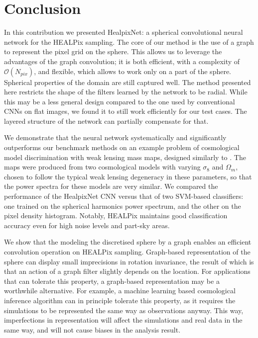 \documentclass[final,twocolumn,3p,times,authoryear]{elsarticle}
\newcommand{\nati}[1]{{\color[rgb]{.1,.6,.1}{#1}}}
\newcommand{\TK}[1]{{\color{red}{TK:#1}}}
\newcommand{\1}{\b{1}}              %
\newcommand{\0}{\b{0}}              %
\begin{document}

\section{Conclusion}
\label{sec:conclusion}

In this contribution we presented HealpixNet: a spherical convolutional neural network for the HEALPix sampling.
The core of our method is the use of a graph to represent the pixel grid on the sphere.
This allows us to leverage the advantages of the graph convolution; it is both efficient, with a complexity of $\mathcal{O}(N_{pix})$, and flexible, which allows to work only on a part of the sphere.
Spherical properties of the domain are still captured well.
The method presented here restricts the shape of the filters learned by the network to be radial.
While this may be a less general design compared to the one used by conventional CNNs on flat images, we found it to still work efficiently for our test cases.
The layered structure of the network can partially compensate for that.

We demonstrate that the neural network systematically and significantly outperforms our benchmark methods on an example problem of cosmological model discrimination with weak lensing mass maps, designed similarly to \citep{schmelze2017cosmologicalmodel}.
The maps were produced from two cosmological models with varying $\sigma_8$ and $\Omega_m$, chosen to follow the typical weak lensing degeneracy in these parameters, so that the power spectra for these models are very similar.
We compared the performance of the HealpixNet CNN versus that of two SVM-based classifiers: one trained on the spherical harmonics power spectrum, and the other on the pixel density histogram.
Notably, HEALPix maintains good classification accuracy even for high noise levels and part-sky areas.

We show that the modeling the discretised sphere by a graph enables an efficient convolution operation on HEALPix sampling.
Graph-based representation of the sphere can display small imprecisions in rotation invariance, the result of which is that an action of a graph filter slightly depends on the location.
For applications that can tolerate this property, a graph-based representation may be a worthwhile alternative.
For example, a machine learning based cosmological inference algorithm can in principle tolerate this property, as it requires the simulations to be represented the same way as observations anyway.
This way, imperfections in representation will affect the simulations and real data in the same way, and will not cause biases in the analysis result.
\end{document}
